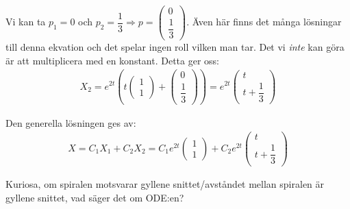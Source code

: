 \noindent Vi kan ta $p_1 = 0$ och $p_2 = \dfrac{1}{3}\Rightarrow p=\begin{pmatrix}0\\\dfrac{1}{3}\end{pmatrix}$. Även här finns det många lösningar till denna ekvation och det spelar ingen roll vilken man tar. Det vi \textit{inte} kan göra är att multiplicera med en konstant. Detta ger oss:
\begin{equation*}
  \begin{gathered}
    X_2 = e^{2t}\left(t\begin{pmatrix}1\\1\end{pmatrix}+\begin{pmatrix}0\\\dfrac{1}{3}\end{pmatrix}\right) = e^{2t}\begin{pmatrix}t\\t+\dfrac{1}{3}\end{pmatrix}
  \end{gathered}
\end{equation*}
\par\bigskip
\noindent Den generella lösningen ges av:
\begin{equation*}
  \begin{gathered}
    X = C_1X_1+C_2X_2 = C_1e^{2t}\begin{pmatrix}1\\1\end{pmatrix}+C_2e^{2t}\begin{pmatrix}t\\t+\dfrac{1}{3}\end{pmatrix}
  \end{gathered}
\end{equation*}
\par\bigskip
\noindent Kuriosa, om spiralen motsvarar gyllene snittet/avståndet mellan spiralen är gyllene snittet, vad säger det om ODE:en?
